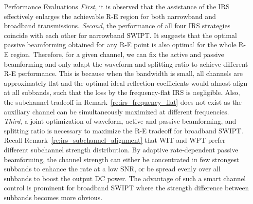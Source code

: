 \documentclass[journal]{IEEEtran}
\begin{document}
\begin{section}{Performance Evaluations}
		\textit{First}, it is observed that the assistance of the IRS effectively enlarges the achievable R-E region for both narrowband and broadband transmissions. \textit{Second}, the performance of all four IRS strategies coincide with each other for narrowband SWIPT. It suggests that the optimal passive beamforming obtained for any R-E point is also optimal for the whole R-E region. Therefore, for a given channel, we can fix the active and passive beamforming and only adapt the waveform and splitting ratio to achieve different R-E performance. This is because when the bandwidth is small, all channels are approximately flat and the optimal ideal reflection coefficients would almost align at all subbands, such that the loss by the frequency-flat IRS is negligible. Also, the subchannel tradeoff in Remark~\ref{re:irs_frequency_flat} does not exist as the auxiliary channel can be simultaneously maximized at different frequencies. \textit{Third}, a joint optimization of waveform, active and passive beamforming, and splitting ratio is necessary to maximize the R-E tradeoff for broadband SWIPT. Recall Remark~\ref{re:irs_subchannel_alignment} that WIT and WPT prefer different subchannel strength distribution. By adaptive rate-dependent passive beamforming, the channel strength can either be concentrated in few strongest subbands to enhance the rate at a low SNR, or be spread evenly over all subbands to boost the output DC power. The advantage of such a smart channel control is prominent for broadband SWIPT where the strength difference between subbands becomes more obvious.
	\end{section}
\end{document}
